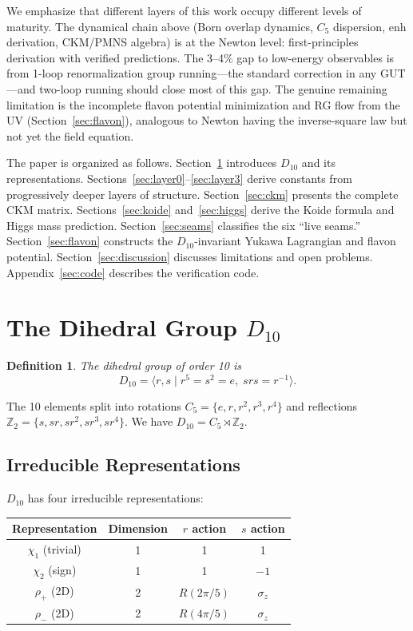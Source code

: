 \documentclass[11pt,a4paper]{article}
\newtheorem{definition}[theorem]{Definition}
\begin{document}
We emphasize that different layers of this work occupy different levels of maturity. The dynamical chain above (Born overlap dynamics, $C_5$ dispersion, $\text{enh}$ derivation, CKM/PMNS algebra) is at the Newton level: first-principles derivation with verified predictions. The 3--4\% gap to low-energy observables is from 1-loop renormalization group running---the standard correction in any GUT---and two-loop running should close most of this gap. The genuine remaining limitation is the incomplete flavon potential minimization and RG flow from the UV (Section~\ref{sec:flavon}), analogous to Newton having the inverse-square law but not yet the field equation.

The paper is organized as follows. Section~\ref{sec:d10} introduces $D_{10}$ and its representations. Sections~\ref{sec:layer0}--\ref{sec:layer3} derive constants from progressively deeper layers of structure. Section~\ref{sec:ckm} presents the complete CKM matrix. Sections~\ref{sec:koide} and~\ref{sec:higgs} derive the Koide formula and Higgs mass prediction. Section~\ref{sec:seams} classifies the six ``live seams.'' Section~\ref{sec:flavon} constructs the $D_{10}$-invariant Yukawa Lagrangian and flavon potential. Section~\ref{sec:discussion} discusses limitations and open problems. Appendix~\ref{sec:code} describes the verification code.

\section{The Dihedral Group $D_{10}$}
\label{sec:d10}

\begin{definition}
The dihedral group of order 10 is
\[
D_{10} = \langle r, s \mid r^5 = s^2 = e,\; srs = r^{-1} \rangle.
\]
\end{definition}

The 10 elements split into rotations $C_5 = \{e, r, r^2, r^3, r^4\}$ and reflections $\mathbb{Z}_2 = \{s, sr, sr^2, sr^3, sr^4\}$. We have $D_{10} = C_5 \rtimes \mathbb{Z}_2$.

\subsection{Irreducible Representations}

$D_{10}$ has four irreducible representations:

\begin{table}[h]
\centering
\begin{tabular}{cccc}
\toprule
Representation & Dimension & $r$ action & $s$ action \\
\midrule
$\chi_1$ (trivial) & 1 & 1 & 1 \\
$\chi_2$ (sign) & 1 & 1 & $-1$ \\
$\rho_+$ (2D) & 2 & $R(2\pi/5)$ & $\sigma_z$ \\
$\rho_-$ (2D) & 2 & $R(4\pi/5)$ & $\sigma_z$ \\
\bottomrule
\end{tabular}
\end{table}
\end{document}
